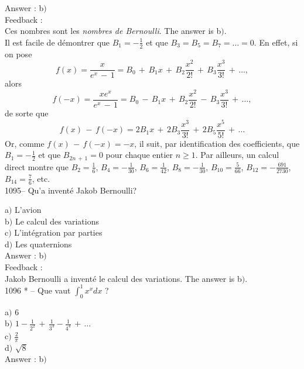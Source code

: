 \documentclass[letterpaper, 12pt]{article}
\begin{document}
Answer : b$)$\\

Feedback : \\
Ces nombres sont les {\sl nombres de Bernoulli}. The answer is
b$)$. \\
Il est facile de d\'emontrer que $B_1=-\frac12$ et que
$B_3=B_5=B_7=\ldots=0$. En effet, si on pose
$$\displaystyle{f(x)=\frac
x{e^x\,-\,1}=B_0\,+\,B_1x\,+\,B_2\frac{x^2}{2!}\,+\,B_3\frac{x^3}{3!}\,+\,\ldots,}$$
alors
$$\displaystyle{f(-x)=\frac{xe^x}{e^x\,-\,1}=B_0\,-\,B_1x\,+\,B_2\frac{x^2}{2!}\,-\,B_3\frac{x^3}{3!}\,+\,\ldots,}$$
de sorte que
$$\displaystyle{f(x)\,-\,f(-x)=2B_1x\,+\,2B_3\frac{x^3}{3!}\,+\,2B_5\frac{x^5}{5!}\,+\,\ldots}$$
Or, comme $f(x)\,-\,f(-x)=-x$, il suit, par identification des
coefficients, que $B_1=-\frac12$ et que $B_{2n\,+\,1}=0$ pour chaque
entier $n\ge1$. Par ailleurs, un calcul direct montre que
$B_2=\frac16$, $B_4=-\frac1{30}$, $B_6=\frac1{42}$,
$B_8=-\frac1{30}$, $B_{10}=\frac5{66}$, $B_{12}=-\frac{691}{2730}$,
$B_{14}=\frac76$, etc.\\


1095-- Qu'a invent\'e Jakob Bernoulli?

a$)$ L'avion\\
b$)$ Le calcul des variations \\
c$)$ L'int\'egration par parties  \\
d$)$ Les quaternions  \\

Answer : b$)$\\

Feedback : \\
Jakob Bernoulli a invent\'e le calcul des variations.
The answer is b$)$.\\

1096 * -- Que vaut $\int_0^1x^xdx$ ?

a$)$ $6$ \\ [2mm] b$)$
$1-\frac1{2^2}\,+\,\frac1{3^3}-\frac1{4^4}\,+\,\ldots$ \\ [3 mm]
c$)$ $\frac2{\pi}$  \\ [2mm]
d$)$ $\sqrt8$\\

Answer : b$)$\\
\end{document}
